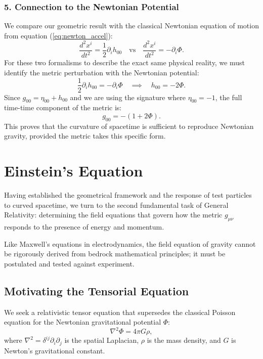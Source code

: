 \documentclass[11pt, a4paper]{report}
\begin{document}
\subsubsection*{5. Connection to the Newtonian Potential}
We compare our geometric result with the classical Newtonian equation of motion from equation (\ref{eq:newton_accel}):
\begin{equation}
\frac{d^{2}x^{i}}{dt^{2}} = \frac{1}{2}\partial_{i}h_{00} \quad \text{vs} \quad \frac{d^{2}x^{i}}{dt^{2}} = -\partial_{i}\Phi.
\end{equation}
For these two formalisms to describe the exact same physical reality, we must identify the metric perturbation with the Newtonian potential:
\begin{equation}
\label{eq:h00_phi}
\frac{1}{2}\partial_{i}h_{00} = -\partial_{i}\Phi \quad \implies \quad h_{00} = -2\Phi.
\end{equation}
Since $g_{00} = \eta_{00} + h_{00}$ and we are using the signature where $\eta_{00} = -1$, the full time-time component of the metric is:
\begin{equation}
g_{00} = -(1 + 2\Phi).
\end{equation}
This proves that the curvature of spacetime is sufficient to reproduce Newtonian gravity, provided the metric takes this specific form.

\section{Einstein's Equation} %

Having established the geometrical framework and the response of test particles to curved spacetime, we turn to the second fundamental task of General Relativity: determining the field equations that govern how the metric $g_{\mu\nu}$ responds to the presence of energy and momentum. %

Like Maxwell's equations in electrodynamics, the field equation of gravity cannot be rigorously derived from bedrock mathematical principles; it must be postulated and tested against experiment. %

\subsection{Motivating the Tensorial Equation}

We seek a relativistic tensor equation that supersedes the classical Poisson equation for the Newtonian gravitational potential $\Phi$:
\begin{equation}
\label{eq:poisson_equation}
\nabla^{2}\Phi = 4\pi G\rho, %
\end{equation}
where $\nabla^{2} = \delta^{ij}\partial_{i}\partial_{j}$ is the spatial Laplacian, $\rho$ is the mass density, and $G$ is Newton's gravitational constant. %
\end{document}
